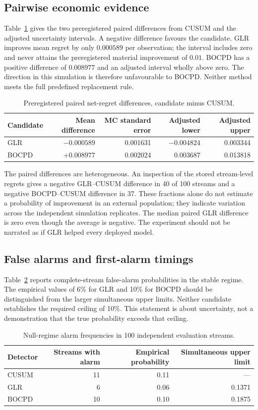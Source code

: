 \documentclass[11pt,a4paper]{article}
\begin{document}
\subsection{Pairwise economic evidence}
Table~\ref{tab:primary} gives the two preregistered paired differences from CUSUM and the adjusted uncertainty intervals. A negative difference favours the candidate. GLR improves mean regret by only $0.000589$ per observation; the interval includes zero and never attains the preregistered material improvement of $0.01$. BOCPD has a positive difference of $0.008977$ and an adjusted interval wholly above zero. The direction in this simulation is therefore unfavourable to BOCPD. Neither method meets the full predefined replacement rule.
\begin{table}[ht]\centering\caption{Preregistered paired net-regret differences, candidate minus CUSUM.}\label{tab:primary}
\begin{tabular}{lrrrr}\toprule Candidate & Mean difference & MC standard error & Adjusted lower & Adjusted upper\\\midrule
GLR & $-0.000589$ & 0.001631 & $-0.004824$ & 0.003344\\
BOCPD & $+0.008977$ & 0.002024 & 0.003687 & 0.013818\\\bottomrule\end{tabular}
\end{table}

The paired differences are heterogeneous. An inspection of the stored stream-level regrets gives a negative GLR--CUSUM difference in 40 of 100 streams and a negative BOCPD--CUSUM difference in 37. These fractions alone do not estimate a probability of improvement in an external population; they indicate variation across the independent simulation replicates. The median paired GLR difference is zero even though the average is negative. The experiment should not be narrated as if GLR helped every deployed model.

\subsection{False alarms and first-alarm timings}
Table~\ref{tab:null} reports complete-stream false-alarm probabilities in the stable regime. The empirical values of 6\% for GLR and 10\% for BOCPD should be distinguished from the larger simultaneous upper limits. Neither candidate establishes the required ceiling of 10\%. This statement is about uncertainty, not a demonstration that the true probability exceeds that ceiling.
\begin{table}[ht]\centering\caption{Null-regime alarm frequencies in 100 independent evaluation streams.}\label{tab:null}
\begin{tabular}{lrrr}\toprule Detector & Streams with alarm & Empirical probability & Simultaneous upper limit\\\midrule
CUSUM & 11 & 0.11 & ---\\
GLR & 6 & 0.06 & 0.1371\\
BOCPD & 10 & 0.10 & 0.1875\\\bottomrule\end{tabular}
\end{table}
\end{document}
